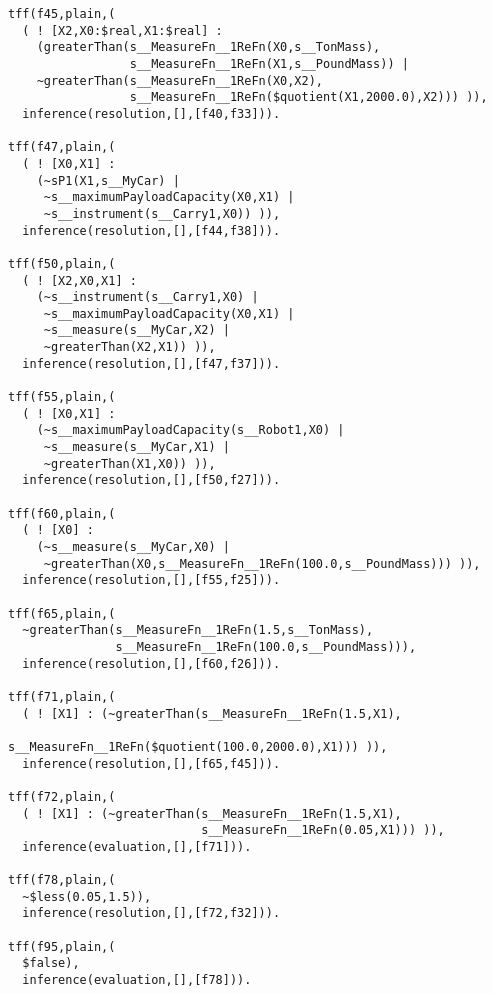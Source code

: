 \documentclass{article}
\begin{document}
\begin{verbatim}
tff(f45,plain,(
  ( ! [X2,X0:$real,X1:$real] : 
    (greaterThan(s__MeasureFn__1ReFn(X0,s__TonMass),
                 s__MeasureFn__1ReFn(X1,s__PoundMass)) |   
    ~greaterThan(s__MeasureFn__1ReFn(X0,X2),
                 s__MeasureFn__1ReFn($quotient(X1,2000.0),X2))) )),
  inference(resolution,[],[f40,f33])).

tff(f47,plain,(
  ( ! [X0,X1] : 
    (~sP1(X1,s__MyCar) | 
     ~s__maximumPayloadCapacity(X0,X1) | 
     ~s__instrument(s__Carry1,X0)) )),
  inference(resolution,[],[f44,f38])).

tff(f50,plain,(
  ( ! [X2,X0,X1] : 
    (~s__instrument(s__Carry1,X0) | 
     ~s__maximumPayloadCapacity(X0,X1) | 
     ~s__measure(s__MyCar,X2) | 
     ~greaterThan(X2,X1)) )),
  inference(resolution,[],[f47,f37])).

tff(f55,plain,(
  ( ! [X0,X1] : 
    (~s__maximumPayloadCapacity(s__Robot1,X0) | 
     ~s__measure(s__MyCar,X1) | 
     ~greaterThan(X1,X0)) )),
  inference(resolution,[],[f50,f27])).

tff(f60,plain,(
  ( ! [X0] : 
    (~s__measure(s__MyCar,X0) | 
     ~greaterThan(X0,s__MeasureFn__1ReFn(100.0,s__PoundMass))) )),
  inference(resolution,[],[f55,f25])).

tff(f65,plain,(
  ~greaterThan(s__MeasureFn__1ReFn(1.5,s__TonMass),
               s__MeasureFn__1ReFn(100.0,s__PoundMass))),
  inference(resolution,[],[f60,f26])).

tff(f71,plain,(
  ( ! [X1] : (~greaterThan(s__MeasureFn__1ReFn(1.5,X1),
                           s__MeasureFn__1ReFn($quotient(100.0,2000.0),X1))) )),
  inference(resolution,[],[f65,f45])).

tff(f72,plain,(
  ( ! [X1] : (~greaterThan(s__MeasureFn__1ReFn(1.5,X1),
                           s__MeasureFn__1ReFn(0.05,X1))) )),
  inference(evaluation,[],[f71])).

tff(f78,plain,(
  ~$less(0.05,1.5)),
  inference(resolution,[],[f72,f32])).

tff(f95,plain,(
  $false),
  inference(evaluation,[],[f78])).


\end{verbatim}

\newpage
\clearpage



 
\end{document}
